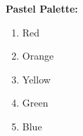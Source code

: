 \documentclass{article}
\begin{document}
    \begin{center}
        \textbf{Pastel Palette:}
    \end{center}

    \begin{enumerate}
        \item {\color{p-red} Red}
        \item {\color{p-orange} Orange}
        \item {\color{p-yellow} Yellow}
        \item {\color{p-green} Green}
        \item {\color{p-blue} Blue}
    \end{enumerate}
\end{document}
